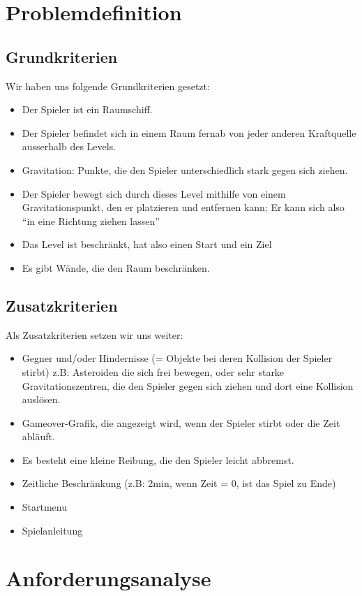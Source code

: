 \documentclass[12pt,a4paper]{scrartcl}
\newcommand{\q}[1]{``#1''}
\begin{document}
\section{Problemdefinition}
\subsection{Grundkriterien}
Wir haben uns folgende Grundkriterien gesetzt:
\begin{itemize}
\item Der Spieler ist ein Raumschiff.
\item Der Spieler befindet sich in einem Raum fernab von jeder anderen Kraftquelle ausserhalb des Levels.
\item Gravitation: Punkte, die den Spieler unterschiedlich stark gegen sich ziehen.
\item Der Spieler bewegt sich durch dieses Level mithilfe von  einem Gravitationspunkt, den er platzieren und entfernen kann; Er kann sich also \q{in eine Richtung ziehen lassen}
\item Das Level ist beschränkt, hat also einen Start und ein Ziel
\item Es gibt Wände, die den Raum beschränken.
\end{itemize}

\subsection{Zusatzkriterien}
Als Zusatzkriterien setzen wir uns weiter:
\begin{itemize}
\item Gegner und/oder Hindernisse (= Objekte bei deren Kollision der Spieler stirbt) z.B: Asteroiden die sich frei bewegen, oder sehr starke Gravitationszentren, die den Spieler gegen sich ziehen und dort eine Kollision auslösen.
\item Gameover-Grafik, die angezeigt wird, wenn der Spieler stirbt oder die Zeit abläuft.
\item Es besteht eine kleine Reibung, die den Spieler leicht abbremst.
\item Zeitliche Beschränkung (z.B: 2min, wenn Zeit = 0, ist das Spiel zu Ende)
\item Startmenu
\item Spielanleitung
\end{itemize}




\section{Anforderungsanalyse}
\end{document}
